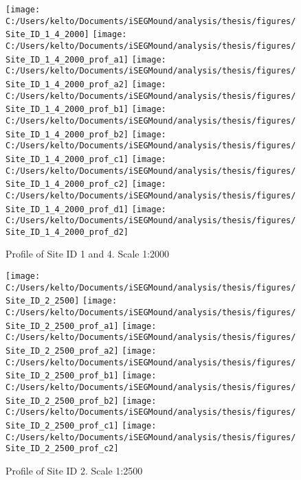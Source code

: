 \documentclass[
  12pt,
]{article}
\begin{document}
\begin{figure}
\texttt{[image: C:/Users/kelto/Documents/iSEGMound/analysis/thesis/figures/Site\_ID\_1\_4\_2000]} \texttt{[image: C:/Users/kelto/Documents/iSEGMound/analysis/thesis/figures/Site\_ID\_1\_4\_2000\_prof\_a1]} \texttt{[image: C:/Users/kelto/Documents/iSEGMound/analysis/thesis/figures/Site\_ID\_1\_4\_2000\_prof\_a2]} \texttt{[image: C:/Users/kelto/Documents/iSEGMound/analysis/thesis/figures/Site\_ID\_1\_4\_2000\_prof\_b1]} \texttt{[image: C:/Users/kelto/Documents/iSEGMound/analysis/thesis/figures/Site\_ID\_1\_4\_2000\_prof\_b2]} \texttt{[image: C:/Users/kelto/Documents/iSEGMound/analysis/thesis/figures/Site\_ID\_1\_4\_2000\_prof\_c1]} \texttt{[image: C:/Users/kelto/Documents/iSEGMound/analysis/thesis/figures/Site\_ID\_1\_4\_2000\_prof\_c2]} \texttt{[image: C:/Users/kelto/Documents/iSEGMound/analysis/thesis/figures/Site\_ID\_1\_4\_2000\_prof\_d1]} \texttt{[image: C:/Users/kelto/Documents/iSEGMound/analysis/thesis/figures/Site\_ID\_1\_4\_2000\_prof\_d2]} \caption{Profile of Site ID 1 and 4. Scale 1:2000}\label{fig:FigureAOI4-1-4}
\end{figure}

\begin{figure}
\texttt{[image: C:/Users/kelto/Documents/iSEGMound/analysis/thesis/figures/Site\_ID\_2\_2500]} \texttt{[image: C:/Users/kelto/Documents/iSEGMound/analysis/thesis/figures/Site\_ID\_2\_2500\_prof\_a1]} \texttt{[image: C:/Users/kelto/Documents/iSEGMound/analysis/thesis/figures/Site\_ID\_2\_2500\_prof\_a2]} \texttt{[image: C:/Users/kelto/Documents/iSEGMound/analysis/thesis/figures/Site\_ID\_2\_2500\_prof\_b1]} \texttt{[image: C:/Users/kelto/Documents/iSEGMound/analysis/thesis/figures/Site\_ID\_2\_2500\_prof\_b2]} \texttt{[image: C:/Users/kelto/Documents/iSEGMound/analysis/thesis/figures/Site\_ID\_2\_2500\_prof\_c1]} \texttt{[image: C:/Users/kelto/Documents/iSEGMound/analysis/thesis/figures/Site\_ID\_2\_2500\_prof\_c2]} \caption{Profile of Site ID 2. Scale 1:2500}\label{fig:FigureAOI4-2}
\end{figure}
\end{document}

